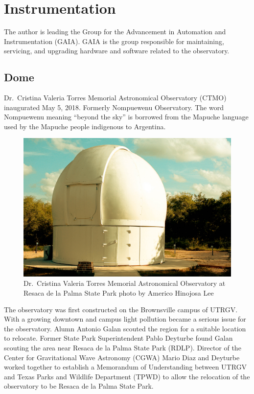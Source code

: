 \chapter{Instrumentation}
\label{chp:instrumentation}
The author is leading the Group for the Advancement in Automation and Instrumentation (GAIA).
GAIA is the group responsible for maintaining, servicing, and upgrading hardware and software related to the observatory.

\section{Dome}
Dr.\ Cristina Valeria Torres Memorial Astronomical Observatory (CTMO) inaugurated May 5, 2018. 
Formerly Nompuewenu Observatory.
The word Nompuewenu meaning ``beyond the sky'' is borrowed from the Mapuche language used by the Mapuche people indigenous to Argentina.

\begin{figure}[h]
    \centering
    \includegraphics[width=\columnwidth]{figures/ctmo.jpg}%
\caption{Dr.\ Cristina Valeria Torres Memorial Astronomical Observatory at Resaca de la Palma State Park photo by Americo Hinojosa Lee}
\label{fig:CTMO}
\end{figure}

The observatory was first constructed on the Brownsville campus of UTRGV\@.
With a growing downtown and campus light pollution became a serious issue for the observatory.
Alumn Antonio Galan scouted the region for a suitable location to relocate.
Former State Park Superintendent Pablo Deyturbe found Galan scouting the area near Resaca de la Palma State Park (RDLP).
Director of the Center for Gravitational Wave Astronomy (CGWA) Mario Diaz and Deyturbe worked together to establish  
a Memorandum of Understanding between UTRGV and Texas Parks and Wildlife Department (TPWD) to allow the relocation
of the observatory to be Resaca de la Palma State Park.


